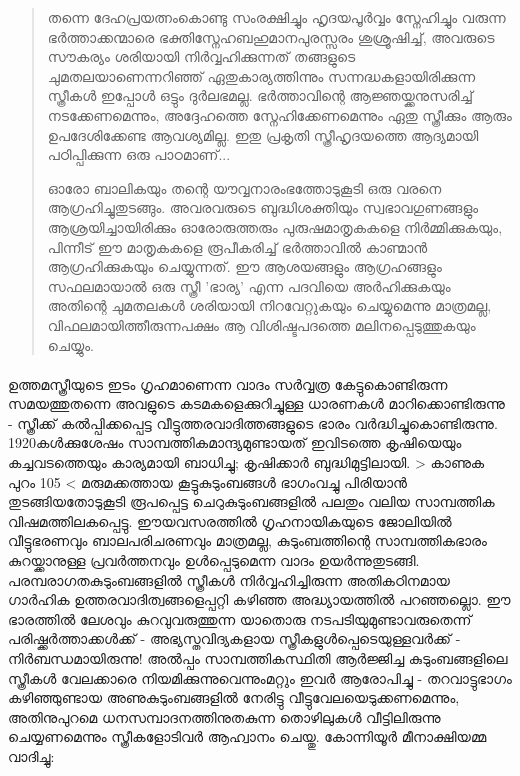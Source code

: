 \begin{quotation}

\noindent
തന്നെ ദേഹപ്രയത്നംകൊണ്ടു സംരക്ഷിച്ചും ഹൃദയപൂർവ്വം സ്നേഹിച്ചും വരുന്ന ഭർത്താക്കന്മാരെ ഭക്തിസ്നേഹബഹുമാനപുരസ്സരം ശുശ്രൂഷിച്ച്, അവരുടെ സൗകര്യം ശരിയായി നിർവ്വഹിക്കുന്നത് തങ്ങളുടെ ചുമതലയാണെന്നറിഞ്ഞ് ഏതുകാര്യത്തിന്നും സന്നദ്ധകളായിരിക്കുന്ന സ്ത്രീകൾ ഇപ്പോൾ ഒട്ടും ദുർലഭമല്ല. ഭർത്താവിന്റെ ആജ്ഞയ്ക്കനുസരിച്ച് നടക്കേണമെന്നും, അദ്ദേഹത്തെ സ്നേഹിക്കേണമെന്നും ഏതു സ്ത്രീക്കും ആരും ഉപദേശിക്കേണ്ട ആവശ്യമില്ല. ഇതു പ്രകൃതി സ്ത്രീഹൃദയത്തെ ആദ്യമായി പഠിപ്പിക്കുന്ന ഒരു പാഠമാണ്...

\noindent ഓരോ ബാലികയും തന്റെ യൗവ്വനാരംഭത്തോടുകൂടി ഒരു വരനെ ആഗ്രഹിച്ചുതുടങ്ങും. അവരവരുടെ ബുദ്ധിശക്തിയും സ്വഭാവഗുണങ്ങളും ആശ്രയിച്ചായിരിക്കും ഓരോരുത്തരും പുരുഷമാതൃകകളെ നിർമ്മിക്കുകയും, പിന്നീട് ഈ മാതൃകകളെ രൂപീകരിച്ച് ഭർത്താവിൽ കാണ്മാൻ ആഗ്രഹിക്കുകയും ചെയ്യുന്നത്. ഈ ആശയങ്ങളും ആഗ്രഹങ്ങളും സഫലമായാൽ ഒരു സ്ത്രീ 'ഭാര്യ' എന്ന പദവിയെ അർഹിക്കുകയും അതിന്റെ ചുമതലകൾ ശരിയായി നിറവേറ്റുകയും ചെയ്യുമെന്നു മാത്രമല്ല, വിഫലമായിത്തീരുന്നപക്ഷം ആ വിശിഷ്ടപദത്തെ മലിനപ്പെടുത്തുകയും ചെയ്യും.
\end{quotation}

\paragraph{}ഉത്തമസ്ത്രീയുടെ ഇടം ഗൃഹമാണെന്ന വാദം സർവ്വത്ര കേട്ടുകൊണ്ടിരുന്ന സമയത്തുതന്നെ അവളുടെ കടമകളെക്കുറിച്ചുള്ള ധാരണകൾ മാറിക്കൊണ്ടിരുന്നു - സ്ത്രീക്ക് കൽപ്പിക്കപ്പെട്ട വീട്ടുത്തരവാദിത്തങ്ങളുടെ ഭാരം വർദ്ധിച്ചുകൊണ്ടിരുന്നു. 1920കൾക്കുശേഷം സാമ്പത്തികമാന്ദ്യമുണ്ടായത് ഇവിടത്തെ കൃഷിയെയും കച്ചവടത്തെയും കാര്യമായി ബാധിച്ചു; കൃഷിക്കാർ ബുദ്ധിമുട്ടിലായി. > കാണുക പുറം 105 < മരുമക്കത്തായ കൂട്ടുകുടുംബങ്ങൾ ഭാഗംവച്ചു പിരിയാൻ തുടങ്ങിയതോടുകൂടി രൂപപ്പെട്ട ചെറുകുടുംബങ്ങളിൽ പലതും വലിയ സാമ്പത്തിക വിഷമത്തിലകപ്പെട്ടു. ഈയവസരത്തിൽ ഗൃഹനായികയുടെ ജോലിയിൽ വീട്ടുഭരണവും ബാലപരിചരണവും മാത്രമല്ല, കുടുംബത്തിന്റെ സാമ്പത്തികഭാരം കുറയ്ക്കാനുള്ള പ്രവർത്തനവും ഉൾപ്പെടുമെന്ന വാദം ഉയർന്നുതുടങ്ങി. പരമ്പരാഗതകുടുംബങ്ങളിൽ സ്ത്രീകൾ നിർവ്വഹിച്ചിരുന്ന അതികഠിനമായ ഗാർഹിക ഉത്തരവാദിത്വങ്ങളെപ്പറ്റി കഴിഞ്ഞ അദ്ധ്യായത്തിൽ പറഞ്ഞല്ലൊ. ഈ ഭാരത്തിൽ ലേശവും കുറവുവരുത്തുന്ന യാതൊരു നടപടിയുമുണ്ടാവരുതെന്ന് പരിഷ്ക്കർത്താക്കൾക്ക് - അഭ്യസ്തവിദ്യകളായ സ്ത്രീകളുൾപ്പെടെയുള്ളവർക്ക് - നിർബന്ധമായിരുന്നു! അൽപ്പം സാമ്പത്തികസ്ഥിതി ആർജ്ജിച്ച കുടുംബങ്ങളിലെ സ്ത്രീകൾ വേലക്കാരെ നിയമിക്കുന്നുവെന്നുംമറ്റും ഇവർ ആരോപിച്ചു - തറവാട്ടുഭാഗം കഴിഞ്ഞുണ്ടായ അണുകുടുംബങ്ങളിൽ നേരിട്ടു വീട്ടുവേലയെടുക്കണമെന്നും, അതിനുപുറമെ ധനസമ്പാദനത്തിനുതകുന്ന തൊഴിലുകൾ വീട്ടിലിരുന്നു ചെയ്യണമെന്നും സ്ത്രീകളോടിവർ ആഹ്വാനം ചെയ്തു. കോന്നിയൂർ മീനാക്ഷിയമ്മ വാദിച്ചു:

